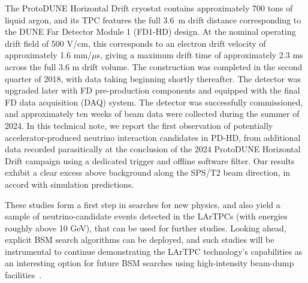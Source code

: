 The ProtoDUNE Horizontal Drift cryostat contains approximately 700 tons of liquid argon, and its TPC features the full 3.6~m drift distance corresponding to the DUNE Far Detector Module 1 (FD1-HD) design. At the nominal operating drift field of 500 V/cm, this corresponds to an electron drift velocity of approximately 1.6 mm/$\mu$s, giving a maximum drift time of approximately 2.3 ms across the full 3.6 m drift volume. The construction was completed in the second quarter of 2018, with data taking beginning shortly thereafter. The detector was upgraded later with FD pre-production components and equipped with the final FD data acquisition (DAQ) system. The detector was successfully commissioned, and approximately ten weeks of beam data were collected during the summer of 2024. In this technical note, we report the first observation of potentially accelerator-produced neutrino interaction candidates in PD-HD, from additional data recorded parasitically at the conclusion of the 2024 ProtoDUNE Horizontal Drift campaign using a dedicated trigger and offline software filter. Our results exhibit a clear excess above background along the SPS/T2 beam direction, in accord with simulation predictions.

These studies form a first step in searches for new physics, and also yield a sample of neutrino-candidate events detected in the LArTPCs (with energies roughly above 10 GeV), that can be used for further studies. Looking ahead, explicit BSM search algorithms can be deployed, and such studies will be instrumental to continue demonstrating the LArTPC technology's capabilities as an interesting option for future BSM searches using high-intensity beam-dump facilities~\cite{Ferrillo:2023hhg}.